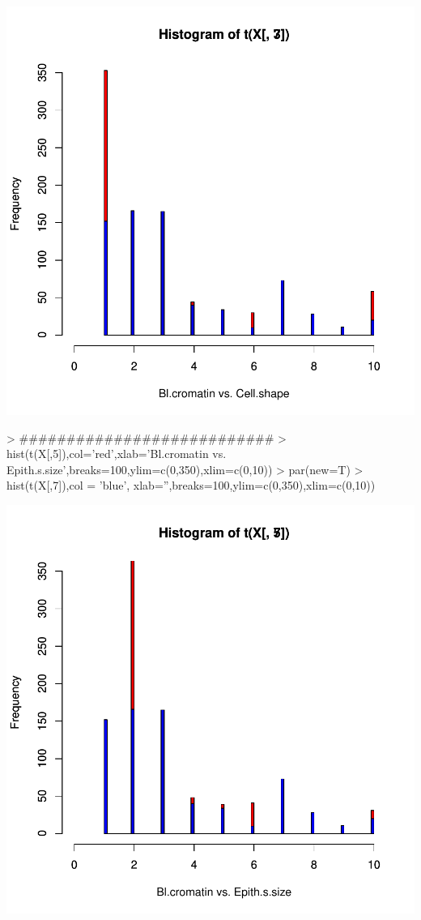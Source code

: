 \documentclass{article}
\begin{document}
\includegraphics{selecao-007}

\begin{Schunk}
\begin{Sinput}
> ###########################
> hist(t(X[,5]),col='red',xlab='Bl.cromatin vs. Epith.s.size',breaks=100,ylim=c(0,350),xlim=c(0,10))
> par(new=T)
> hist(t(X[,7]),col = 'blue', xlab='',breaks=100,ylim=c(0,350),xlim=c(0,10))
\end{Sinput}
\end{Schunk}
\includegraphics{selecao-008}
\end{document}
